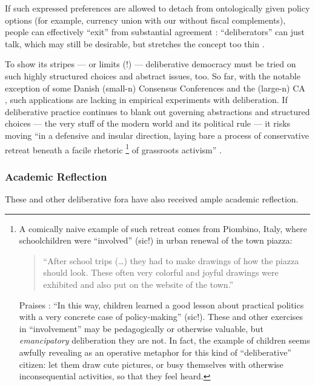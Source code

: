 If such expressed preferences are allowed to detach from ontologically given policy options (for example, currency union with our without fiscal complements), people can effectively ``exit'' from substantial agreement \citep[377]{Landwehr2010}: ``deliberators'' can just talk, which may still be desirable, but stretches the concept too thin \citep[502]{Thompson2008}.

To show its stripes --- or limits (!) --- deliberative democracy must be tried on such highly structured choices and abstract issues, too.
So far, with the notable exception of some Danish (small-n) Consensus Conferences and the (large-n) \gls{CA} \citep[on its complexity,][]{Blais2008}, such applications are lacking in empirical experiments with deliberation. 
If deliberative practice continues to blank out governing abstractions and structured choices --- the very stuff of the modern world and its political rule --- it risks moving ``in a defensive and insular direction, laying bare a process of conservative retreat beneath a facile rhetoric 
\footnote{
	A comically naive example of such retreat comes from  Piombino, Italy, where schoolchildren were ``involved'' (sic!) in urban renewal of the town piazza: 
	\begin{quote}
		``After school trips (\ldots) they had to make drawings of how the piazza should look. 
		These often very colorful and joyful drawings were exhibited and also put on the website of the town.''
	\end{quote}
	Praises \citet[29]{Steiner2012}: ``In this way, children learned a good lesson about practical politics with a very concrete case of policy-making'' (sic!).
	These and other exercises in ``involvement'' may be pedagogically or otherwise valuable, but \emph{emancipatory} deliberation they are not.
	In fact, the example of children seems awfully revealing as an operative metaphor for this kind of ``deliberative'' citizen: let them draw cute pictures, or busy themselves with otherwise inconsequential activities, so that they feel heard.
}
of grassroots activism'' \citep[759]{Boggs-1997-aa}.

\subsubsection{Academic Reflection}
These and other deliberative fora have also received ample academic reflection.

